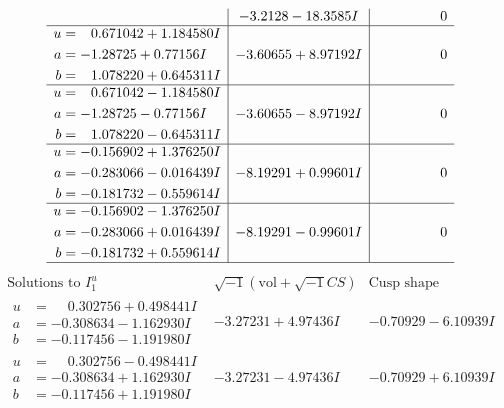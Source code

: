 \documentclass[1p]{elsarticle_modified}
\theoremstyle{definition}
\newcommand{\I}{\sqrt{-1}}
\begin{document}
$$\begin{array}{c|c|c}
 & -3.2128 - 18.3585 I & \phantom{-0.000000 } 0 \\ \hline\begin{aligned}
u &= \phantom{-}0.671042 + 1.184580 I \\
a &= -1.28725 + 0.77156 I \\
b &= \phantom{-}1.078220 + 0.645311 I\end{aligned}
 & -3.60655 + 8.97192 I & \phantom{-0.000000 } 0 \\ \hline\begin{aligned}
u &= \phantom{-}0.671042 - 1.184580 I \\
a &= -1.28725 - 0.77156 I \\
b &= \phantom{-}1.078220 - 0.645311 I\end{aligned}
 & -3.60655 - 8.97192 I & \phantom{-0.000000 } 0 \\ \hline\begin{aligned}
u &= -0.156902 + 1.376250 I \\
a &= -0.283066 - 0.016439 I \\
b &= -0.181732 - 0.559614 I\end{aligned}
 & -8.19291 + 0.99601 I & \phantom{-0.000000 } 0 \\ \hline\begin{aligned}
u &= -0.156902 - 1.376250 I \\
a &= -0.283066 + 0.016439 I \\
b &= -0.181732 + 0.559614 I\end{aligned}
 & -8.19291 - 0.99601 I & \phantom{-0.000000 } 0\\
 \hline 
 \end{array}$$\newpage$$\begin{array}{c|c|c}  
\text{Solutions to }I^u_{1}& \I (\text{vol} + \sqrt{-1}CS) & \text{Cusp shape}\\
 \hline 
\begin{aligned}
u &= \phantom{-}0.302756 + 0.498441 I \\
a &= -0.308634 - 1.162930 I \\
b &= -0.117456 - 1.191980 I\end{aligned}
 & -3.27231 + 4.97436 I & -0.70929 - 6.10939 I \\ \hline\begin{aligned}
u &= \phantom{-}0.302756 - 0.498441 I \\
a &= -0.308634 + 1.162930 I \\
b &= -0.117456 + 1.191980 I\end{aligned}
 & -3.27231 - 4.97436 I & -0.70929 + 6.10939 I \\ \hline\begin{aligned}

\end{aligned}
\end{array}$$
\end{document}
